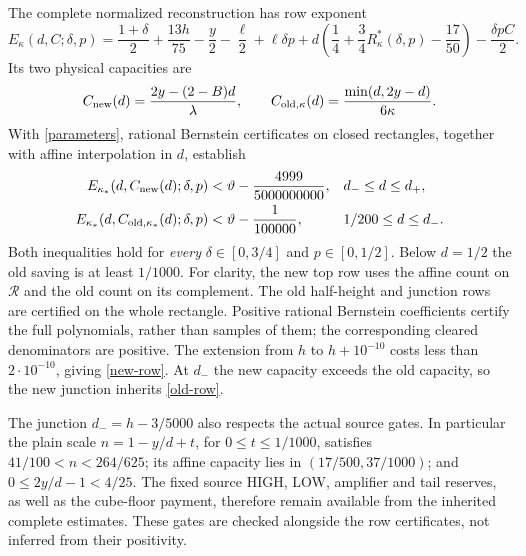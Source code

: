 \documentclass[10pt,a4paper]{article}
\newcommand{\tht}{\vartheta}
\newcommand{\Reg}{\mathcal R}
\begin{document}
The complete normalized reconstruction has row exponent
\begin{equation}
 E_\kappa(d,C;\delta,p)=\frac{1+\delta}{2}+\frac{13h}{75}
 -\frac y2-\frac\ell2+\ell\delta p
 +d\left(\frac14+\frac34R^*_\kappa(\delta,p)-\frac{17}{50}\right)
 -\frac{\delta p C}{2}.\label{row}
\end{equation}
Its two physical capacities are
\[
 C_{\rm new}(d)=\frac{2y-(2-B)d}{\lambda},\qquad
 C_{{\rm old},\kappa}(d)=\frac{\min(d,2y-d)}{6\kappa}.
\]
With \eqref{parameters}, rational Bernstein certificates on closed
rectangles, together with affine interpolation in $d$, establish
\begin{align}
 E_{\kappa_*}(d,C_{\rm new}(d);\delta,p)
  &<\tht-\frac{4999}{5000000000},&&d_-\leq d\leq d_+,\label{new-row}\\
 E_{\kappa_*}(d,C_{{\rm old},\kappa_*}(d);\delta,p)
  &<\tht-\frac1{100000},&&1/200\leq d\leq d_- .\label{old-row}
\end{align}
Both inequalities hold for \emph{every} $\delta\in[0,3/4]$ and
$p\in[0,1/2]$. Below $d=1/2$ the old saving is at least $1/1000$.
For clarity, the new top row uses the affine count on $\Reg$ and the old
count on its complement. The old half-height and junction rows are
certified on the whole rectangle. Positive rational Bernstein
coefficients certify the full polynomials, rather than samples of them;
the corresponding cleared denominators are positive. The extension from
$h$ to $h+10^{-10}$ costs less than $2\cdot10^{-10}$, giving
\eqref{new-row}. At $d_-$ the new capacity exceeds the old capacity,
so the new junction inherits \eqref{old-row}.

The junction $d_-=h-3/5000$ also respects the actual source gates.
In particular the plain scale $n=1-y/d+t$, for $0\leq t\leq1/1000$,
satisfies $41/100<n<264/625$; its affine capacity lies in
$(17/500,37/1000)$; and
$0\leq2y/d-1<4/25$. The fixed source HIGH, LOW, amplifier and tail
reserves, as well as the cube-floor payment, therefore remain available
from the inherited complete estimates. These gates are checked alongside
the row certificates, not inferred from their positivity.
\end{document}
